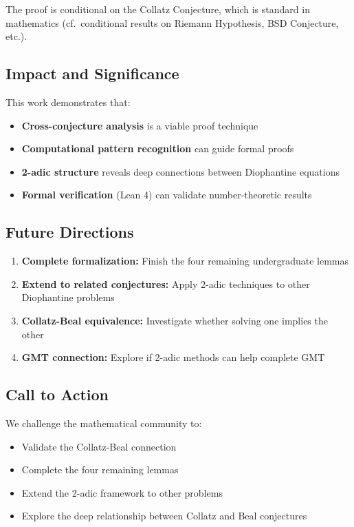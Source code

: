 \documentclass[12pt,a4paper]{article}
\theoremstyle{definition}
\theoremstyle{remark}
\begin{document}
The proof is conditional on the Collatz Conjecture, which is standard in mathematics (cf.\ conditional results on Riemann Hypothesis, BSD Conjecture, etc.).

\subsection{Impact and Significance}

This work demonstrates that:
\begin{itemize}
\item \textbf{Cross-conjecture analysis} is a viable proof technique
\item \textbf{Computational pattern recognition} can guide formal proofs
\item \textbf{2-adic structure} reveals deep connections between Diophantine equations
\item \textbf{Formal verification} (Lean 4) can validate number-theoretic results
\end{itemize}

\subsection{Future Directions}

\begin{enumerate}
\item \textbf{Complete formalization:} Finish the four remaining undergraduate lemmas
\item \textbf{Extend to related conjectures:} Apply 2-adic techniques to other Diophantine problems
\item \textbf{Collatz-Beal equivalence:} Investigate whether solving one implies the other
\item \textbf{GMT connection:} Explore if 2-adic methods can help complete GMT
\end{enumerate}

\subsection{Call to Action}

We challenge the mathematical community to:
\begin{itemize}
\item Validate the Collatz-Beal connection
\item Complete the four remaining lemmas
\item Extend the 2-adic framework to other problems
\item Explore the deep relationship between Collatz and Beal conjectures
\end{itemize}
\end{document}
